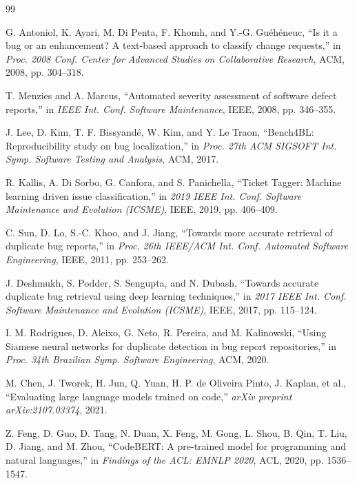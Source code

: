 \begin{thebibliography}{99}

G. Antoniol, K. Ayari, M. Di Penta, F. Khomh, and Y.-G. Gu\'eh\'eneuc, ``Is it a bug or an enhancement? A text-based approach to classify change requests,'' in \textit{Proc. 2008 Conf. Center for Advanced Studies on Collaborative Research}, ACM, 2008, pp. 304--318.

T. Menzies and A. Marcus, ``Automated severity assessment of software defect reports,'' in \textit{IEEE Int. Conf. Software Maintenance}, IEEE, 2008, pp. 346--355.

J. Lee, D. Kim, T. F. Bissyand\'e, W. Kim, and Y. Le Traon, ``Bench4BL: Reproducibility study on bug localization,'' in \textit{Proc. 27th ACM SIGSOFT Int. Symp. Software Testing and Analysis}, ACM, 2017.

R. Kallis, A. Di Sorbo, G. Canfora, and S. Panichella, ``Ticket Tagger: Machine learning driven issue classification,'' in \textit{2019 IEEE Int. Conf. Software Maintenance and Evolution (ICSME)}, IEEE, 2019, pp. 406--409.

C. Sun, D. Lo, S.-C. Khoo, and J. Jiang, ``Towards more accurate retrieval of duplicate bug reports,'' in \textit{Proc. 26th IEEE/ACM Int. Conf. Automated Software Engineering}, IEEE, 2011, pp. 253--262.

J. Deshmukh, S. Podder, S. Sengupta, and N. Dubash, ``Towards accurate duplicate bug retrieval using deep learning techniques,'' in \textit{2017 IEEE Int. Conf. Software Maintenance and Evolution (ICSME)}, IEEE, 2017, pp. 115--124.

I. M. Rodrigues, D. Aleixo, G. Neto, R. Pereira, and M. Kalinowski, ``Using Siamese neural networks for duplicate detection in bug report repositories,'' in \textit{Proc. 34th Brazilian Symp. Software Engineering}, ACM, 2020.

M. Chen, J. Tworek, H. Jun, Q. Yuan, H. P. de Oliveira Pinto, J. Kaplan, et al., ``Evaluating large language models trained on code,'' \textit{arXiv preprint arXiv:2107.03374}, 2021.

Z. Feng, D. Guo, D. Tang, N. Duan, X. Feng, M. Gong, L. Shou, B. Qin, T. Liu, D. Jiang, and M. Zhou, ``CodeBERT: A pre-trained model for programming and natural languages,'' in \textit{Findings of the ACL: EMNLP 2020}, ACL, 2020, pp. 1536--1547.


\end{thebibliography}

